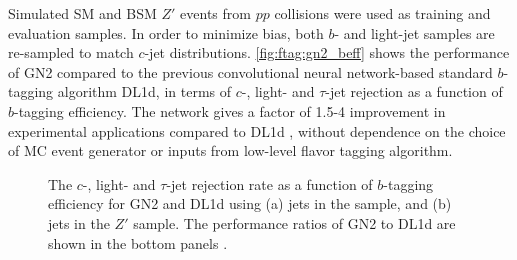 \documentclass[../thesis.tex]{subfiles}
\begin{document}
Simulated \acs{SM} \ttbar and \acs{BSM} $Z'$ events from $pp$ collisions were used as training and evaluation samples. In order to minimize bias, both $b$- and light-jet samples are re-sampled to match $c$-jet distributions. \autoref{fig:ftag:gn2_beff} shows the performance of GN2 compared to the previous convolutional neural network-based standard $b$-tagging algorithm DL1d, in terms of $c$-, light- and $\tau$-jet rejection as a function of $b$-tagging efficiency. The network gives a factor of 1.5-4 improvement in experimental applications compared to DL1d \citep{ftag:gn2}, without dependence on the choice of MC event generator or inputs from low-level flavor tagging algorithm.

\begin{figure}[!htb]
\centering
{}
\caption[The $c$-, light- and $\tau$-jet rejection rate as a function of $b$-tagging efficiency for GN2 and DL1d using (a) jets in the \ttbar sample, and (b) jets in the $Z'$ sample. The performance ratios of GN2 to DL1d are shown in the bottom panels.]{\label{fig:ftag:gn2_beff}The $c$-, light- and $\tau$-jet rejection rate as a function of $b$-tagging efficiency for GN2 and DL1d using (a) jets in the \ttbar sample, and (b) jets in the $Z'$ sample. The performance ratios of GN2 to DL1d are shown in the bottom panels \citep{ftag:gn2}.}
\end{figure}
\end{document}

